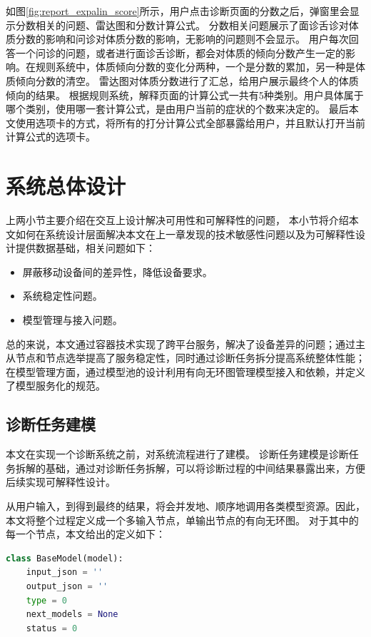 如图\ref{fig:report_expalin_score}所示，用户点击诊断页面的分数之后，弹窗里会显示分数相关的问题、雷达图和分数计算公式。
分数相关问题展示了面诊舌诊对体质分数的影响和问诊对体质分数的影响，无影响的问题则不会显示。
用户每次回答一个问诊的问题，或者进行面诊舌诊断，都会对体质的倾向分数产生一定的影响。在规则系统中，体质倾向分数的变化分两种，一个是分数的累加，另一种是体质倾向分数的清空。
雷达图对体质分数进行了汇总，给用户展示最终个人的体质倾向的结果。
根据规则系统，解释页面的计算公式一共有5种类别。用户具体属于哪个类别，使用哪一套计算公式，是由用户当前的症状的个数来决定的。
最后本文使用选项卡的方式，将所有的打分计算公式全部暴露给用户，并且默认打开当前计算公式的选项卡。


\section{系统总体设计}
上两小节主要介绍在交互上设计解决可用性和可解释性的问题，
本小节将介绍本文如何在系统设计层面解决本文在上一章发现的技术敏感性问题以及为可解释性设计提供数据基础，相关问题如下：
\begin{itemize}
    \item 屏蔽移动设备间的差异性，降低设备要求。
    \item 系统稳定性问题。
    \item 模型管理与接入问题。
\end{itemize}

总的来说，本文通过容器技术实现了跨平台服务，解决了设备差异的问题；通过主从节点和节点选举提高了服务稳定性，同时通过诊断任务拆分提高系统整体性能；
在模型管理方面，通过模型池的设计利用有向无环图管理模型接入和依赖，并定义了模型服务化的规范。

\subsection{诊断任务建模}
本文在实现一个诊断系统之前，对系统流程进行了建模。
诊断任务建模是诊断任务拆解的基础，通过对诊断任务拆解，可以将诊断过程的中间结果暴露出来，方便后续实现可解释性设计。

从用户输入，到得到最终的结果，将会并发地、顺序地调用各类模型资源。因此，本文将整个过程定义成一个多输入节点，单输出节点的有向无环图。
对于其中的每一个节点，本文给出的定义如下：
\begin{lstlisting}[language={Python}, title=model.py]
class BaseModel(model):
    input_json = ''
    output_json = ''
    type = 0
    next_models = None
    status = 0
    
\end{lstlisting}

